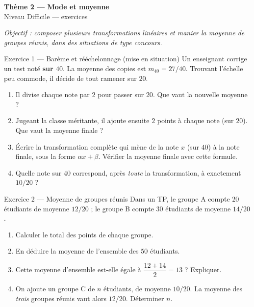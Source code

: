\documentclass[11pt,a4paper]{article}
\newcommand{\bandeau}[2]{%
\begin{tcolorbox}[boxbase,colback=primary,colframe=primarydark,halign=center,
   before skip=2pt,after skip=12pt]
{\LARGE\bfseries\color{white} #1}\\[3pt]{\normalsize\color{white} #2}
\end{tcolorbox}}
\begin{document}
\bandeau{Thème 2 — Mode et moyenne}{Niveau Difficile — exercices}

\noindent\textit{Objectif : composer plusieurs transformations linéaires et manier la moyenne de
groupes réunis, dans des situations de type concours.}\medskip

\begin{exobox}{Exercice 1 — Barème et rééchelonnage (mise en situation)}
Un enseignant corrige un test noté \textbf{sur $40$}. La moyenne des copies est $m_{40}=27/40$.
Trouvant l'échelle peu commode, il décide de tout ramener sur $20$.
\begin{enumerate}[label=\textbf{(\alph*)}]
  \item Il divise chaque note par $2$ pour passer sur $20$. Que vaut la nouvelle moyenne ?
  \item Jugeant la classe méritante, il ajoute ensuite $2$ points à chaque note (sur $20$).
        Que vaut la moyenne finale ?
  \item Écrire la transformation complète qui mène de la note $x$ (sur $40$) à la note finale,
        sous la forme $\alpha x+\beta$. Vérifier la moyenne finale avec cette formule.
  \item Quelle note sur $40$ correspond, après \emph{toute} la transformation, à exactement $10/20$ ?
\end{enumerate}
\end{exobox}

\begin{exobox}{Exercice 2 — Moyenne de groupes réunis}
Dans un TP, le groupe A compte $20$ étudiants de moyenne $12/20$ ; le groupe B compte $30$ étudiants
de moyenne $14/20$.
\begin{enumerate}[label=\textbf{(\alph*)}]
  \item Calculer le total des points de chaque groupe.
  \item En déduire la moyenne de l'ensemble des $50$ étudiants.
  \item Cette moyenne d'ensemble est-elle égale à $\dfrac{12+14}{2}=13$ ? Expliquer.
  \item On ajoute un groupe C de $n$ étudiants, de moyenne $10/20$. La moyenne des \emph{trois}
        groupes réunis vaut alors $12/20$. Déterminer $n$.
\end{enumerate}
\end{exobox}
\end{document}
